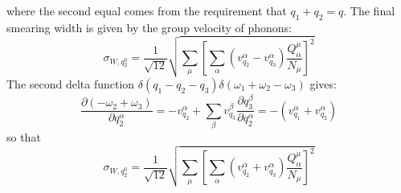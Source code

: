 \documentclass{article}
\begin{document}
where the second equal comes from the requirement that $q_1 + q_2 = q$. The final smearing width is given 
by the group velocity of phonons:
\begin{equation}
    \sigma_{W,q_2^0} = \frac{1}{\sqrt{12}} \sqrt{ \sum_\mu \left[ \sum_{\alpha}\left( v_{q_2}^{\alpha} - v_{q_3}^{\alpha} \right)
                 \frac{Q_{\alpha}^{\mu}}{ N_{\mu}}  \right]^2  } \label{final1}
\end{equation}
The second delta function $\delta(q_1 - q_2 -q_3)\delta(\omega_1 + \omega_2 - \omega_3)$ gives:
\begin{equation}
    \frac{ \partial( - \omega_2 + \omega_3) } {\partial q_2^{\alpha} } 
    = - v_{q_2}^{\alpha} + \sum_{\beta} v_{q_3}^{\beta} \frac{\partial q_3^{\beta}}{\partial q_2^{\alpha}}
    = - ( v_{q_1}^{\alpha} + v_{q_2}^{\alpha} )
\end{equation}
so that 
\begin{equation}
    \sigma_{W,q_2^0} = \frac{1}{\sqrt{12}} \sqrt{ \sum_\mu \left[ \sum_{\alpha}\left( v_{q_2}^{\alpha} + v_{q_3}^{\alpha} \right)
                 \frac{Q_{\alpha}^{\mu}}{ N_{\mu}}  \right]^2  } \label{final2}
\end{equation}
\end{document}
